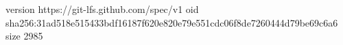 version https://git-lfs.github.com/spec/v1
oid sha256:31ad518e515433bdf16187f620e820e79e551cdc06f8de7260444d79be69c6a6
size 2985
